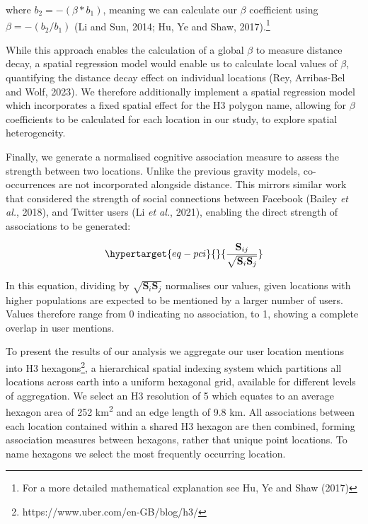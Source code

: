 \documentclass[
  letterpaper,
  11pt,
  english,
  onehalfspacing,
  headsepline]{MastersDoctoralThesis}
\begin{document}
where \(b_2 = -(\beta * b_1)\), meaning we can calculate our \(\beta\)
coefficient using \(\beta = -(b_2 / b_1)\) (Li and Sun, 2014; Hu, Ye and
Shaw, 2017).\footnote{For a more detailed mathematical explanation see
  Hu, Ye and Shaw (2017)}

While this approach enables the calculation of a global \(\beta\) to
measure distance decay, a spatial regression model would enable us to
calculate local values of \(\beta\), quantifying the distance decay
effect on individual locations (Rey, Arribas-Bel and Wolf, 2023). We
therefore additionally implement a spatial regression model which
incorporates a fixed spatial effect for the H3 polygon name, allowing
for \(\beta\) coefficients to be calculated for each location in our
study, to explore spatial heterogeneity.

Finally, we generate a normalised cognitive association measure to
assess the strength between two locations. Unlike the previous gravity
models, co-occurrences are not incorporated alongside distance. This
mirrors similar work that considered the strength of social connections
between Facebook (Bailey \emph{et al.}, 2018), and Twitter users (Li
\emph{et al.}, 2021), enabling the direct strength of associations to be
generated:

\begin{equation}\protect\hypertarget{eq-pci}{}{
\frac{\mathbf{S}_{i j}}{\sqrt{\mathbf{S}_{i} \mathbf{S}_{j}}}
}\label{eq-pci}\end{equation}

In this equation, dividing by \(\sqrt{\mathbf{S}_{i} \mathbf{S}_{j}}\)
normalises our values, given locations with higher populations are
expected to be mentioned by a larger number of users. Values therefore
range from 0 indicating no association, to 1, showing a complete overlap
in user mentions.

To present the results of our analysis we aggregate our user location
mentions into H3 hexagons\footnote{https://www.uber.com/en-GB/blog/h3/},
a hierarchical spatial indexing system which partitions all locations
across earth into a uniform hexagonal grid, available for different
levels of aggregation. We select an H3 resolution of 5 which equates to
an average hexagon area of 252 km\textsuperscript{2} and an edge length
of 9.8 km. All associations between each location contained within a
shared H3 hexagon are then combined, forming association measures
between hexagons, rather that unique point locations. To name hexagons
we select the most frequently occurring location.
\end{document}
